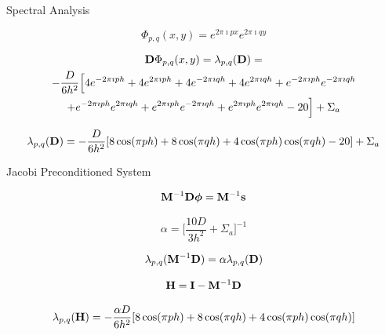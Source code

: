 \documentclass{beamer}
\begin{document}
\begin{frame}{Spectral Analysis}

\begin{equation}
  \Phi_{p,q}(x,y) = e^{2 \pi \imath p x} e^{2 \pi \imath q y}
  \label{eq:eigenfunction_form}
\end{equation}

\begin{multline}
  \mathbf{D}\Phi_{p,q}(x,y) = \lambda_{p,q}(\mathbf{D})
  =\\ -\frac{D}{6h^2}\Big[4 e^{-2 \pi \imath p h} + 4 e^{2 \pi \imath
      p h} + 4 e^{-2 \pi \imath q h} + 4 e^{2 \pi \imath q h} + e^{-2
      \pi \imath p h} e^{-2 \pi \imath q h} \\ + e^{-2 \pi \imath p h}
    e^{2 \pi \imath q h} + e^{2 \pi \imath p h} e^{-2 \pi \imath q h}
    + e^{2 \pi \imath p h} e^{2 \pi \imath q h} - 20\Big] + \Sigma_a
  \label{eq:deriv_diff_1}
\end{multline}

\begin{equation}
  \lambda_{p,q}(\mathbf{D}) = -\frac{D}{6h^2}[ 8 \cos(\pi p h) + 8
    \cos(\pi q h) + 4 \cos(\pi p h) \cos(\pi q h) - 20] + \Sigma_a
  \label{eq:deriv_diff_2}
\end{equation}

\end{frame}

\begin{frame}{Jacobi Preconditioned System}

\begin{equation}
  \mathbf{M}^{-1} \mathbf{D} \boldsymbol{\phi} = \mathbf{M}^{-1} \mathbf{s}
  \label{eq:precond_diffsion}
\end{equation}

\begin{equation}
  \alpha = \Bigg[\frac{10 D}{3 h^2} + \Sigma_a\Bigg]^{-1}
  \label{eq:jacobi_scaling}
\end{equation}

\begin{equation}
  \lambda_{p,q}(\mathbf{M}^{-1} \mathbf{D}) = \alpha \lambda_{p,q}(\mathbf{D})
  \label{eq:preconditioned_Eigenvalues}
\end{equation}

\begin{equation}
  \mathbf{H} = \mathbf{I} - \mathbf{M}^{-1} \mathbf{D}
  \label{eq:iteration_matrix}
\end{equation}

\begin{equation}
  \lambda_{p,q}(\mathbf{H}) = -\frac{\alpha D}{6h^2}[ 8 \cos(\pi p h) + 8
    \cos(\pi q h) + 4 \cos(\pi p h) \cos(\pi q h)]
  \label{eq:iteration_spectrum}
\end{equation}

\end{frame}
\end{document}
